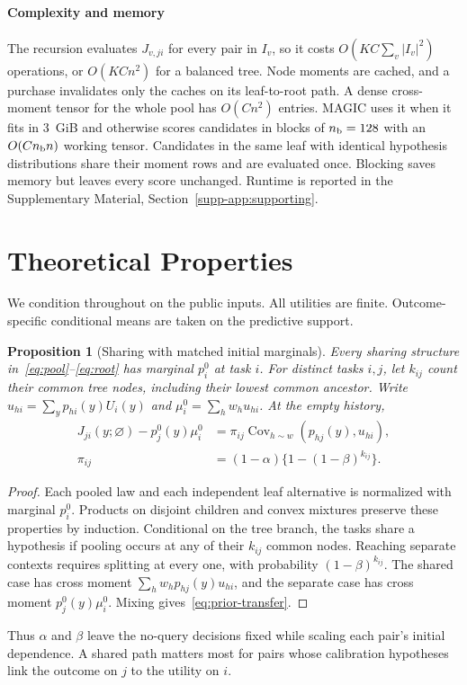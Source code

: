 \documentclass[journal]{IEEEtran}
\newtheorem{proposition}{Proposition}
\begin{document}
\paragraph{Complexity and memory}
The recursion evaluates $J_{v,ji}$ for every pair in $I_v$, so it costs $O(KC\sum_v|I_v|^2)$ operations, or $O(KCn^2)$ for a balanced tree. Node moments are cached, and a purchase invalidates only the caches on its leaf-to-root path. A dense cross-moment tensor for the whole pool has $O(Cn^2)$ entries. MAGIC uses it when it fits in 3~GiB and otherwise scores candidates in blocks of $n_{\rm b}=128$ with an $O(Cn_{\rm b}n)$ working tensor. Candidates in the same leaf with identical hypothesis distributions share their moment rows and are evaluated once. Blocking saves memory but leaves every score unchanged. Runtime is reported in the Supplementary Material, Section~\ref{supp-app:supporting}.

\section{Theoretical Properties}
\label{sec:theory}
We condition throughout on the public inputs. All utilities are finite. Outcome-specific conditional means are taken on the predictive support.

\begin{proposition}[Sharing with matched initial marginals]\label{prop:matched}
Every sharing structure in~\eqref{eq:pool}--\eqref{eq:root} has marginal $p_i^0$ at task $i$. For distinct tasks $i,j$, let $k_{ij}$ count their common tree nodes, including their lowest common ancestor. Write $u_{hi}=\sum_y p_{hi}(y)U_i(y)$ and $\mu_i^0=\sum_h w_h u_{hi}$. At the empty history,
\begin{align}
 J_{ji}(y;\varnothing)-p_j^0(y)\mu_i^0
 &=\pi_{ij}\operatorname{Cov}_{h\sim w}(p_{hj}(y),u_{hi}),\label{eq:prior-transfer}\\
 \pi_{ij}&=(1-\alpha)\{1-(1-\beta)^{k_{ij}}\}.\nonumber
\end{align}
\end{proposition}
\begin{proof}
Each pooled law and each independent leaf alternative is normalized with marginal $p_i^0$. Products on disjoint children and convex mixtures preserve these properties by induction. Conditional on the tree branch, the tasks share a hypothesis if pooling occurs at any of their $k_{ij}$ common nodes. Reaching separate contexts requires splitting at every one, with probability $(1-\beta)^{k_{ij}}$. The shared case has cross moment $\sum_h w_h p_{hj}(y)u_{hi}$, and the separate case has cross moment $p_j^0(y)\mu_i^0$. Mixing gives~\eqref{eq:prior-transfer}.
\end{proof}
Thus $\alpha$ and $\beta$ leave the no-query decisions fixed while scaling each pair's initial dependence. A shared path matters most for pairs whose calibration hypotheses link the outcome on $j$ to the utility on $i$.
\end{document}
